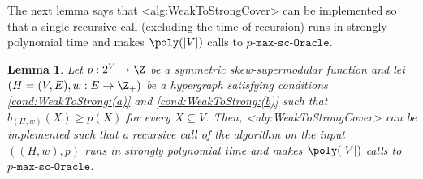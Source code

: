\documentclass{article}
\def\Cref#1{<#1>}%
\newtheorem{lemma}{Lemma}[section]
\newcommand{\functionMaximizationOracleStrongCover}[1]{\ensuremath{{#1}\text{-}\mathtt{max}\text{-}\mathtt{sc}\text{-}\mathtt{Oracle}}\xspace}
\newcommand{\maximalTightSetContainingHyperedge}[1]{\ensuremath{\tau_{#1}}\xspace}
\begin{document}
The next lemma says that \Cref{alg:WeakToStrongCover} can be implemented so that a single recursive call (excluding the time of recursion) runs in strongly polynomial time and makes $\poly(|V|)$ calls to \functionMaximizationOracleStrongCover{p}.
  \begin{lemma}\label{lem:WeakToStrongCover:single-recursive-call-strongly-polytime}
      Let $p:2^V\rightarrow\Z$ be a symmetric skew-supermodular function and let $\left(H = (V, E), w:E \rightarrow\Z_+\right)$ be a hypergraph satisfying conditions \ref{cond:WeakToStrong:(a)} and \ref{cond:WeakToStrong:(b)} such that $b_{(H,w)}(X) \geq p(X)$ for every $X \subseteq V$. Then, 
 \Cref{alg:WeakToStrongCover} can be implemented such that a recursive call of the algorithm on the input $((H,w), p)$ runs in strongly polynomial time and makes $\poly(|V|)$ calls to \functionMaximizationOracleStrongCover{p}.
  \end{lemma}  
\end{document}
